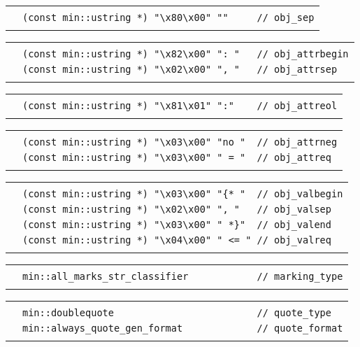 \documentclass[12pt]{article}
\newenvironment{indpar}[1][0.3in]%
	{\begin{list}{}%
		     {\setlength{\itemsep}{0in}%
		      \setlength{\topsep}{0in}%
		      \setlength{\parsep}{1ex}%
		      \setlength{\labelwidth}{#1}%
		      \setlength{\leftmargin}{#1}%
		      \addtolength{\leftmargin}{\labelsep}}%
	 \item}%
	{\end{list}}
\newlength{\ARGBREAKLENGTH}
\newcommand{\ARGBREAK}[1][\ARGBREAKLENGTH]{\\&\hspace*{#1}}
\begin{document}
\begin{indpar}[1em]
\vspace{-4ex}\begin{tabular}{r@{}l}\hspace*{0.1in}\ARGBREAK
\verb|(const min::ustring *) "\x80\x00" ""     // obj_sep|\ARGBREAK
\end{tabular}

\vspace{-4ex}\begin{tabular}{r@{}l}\hspace*{0.1in}\ARGBREAK
\verb|(const min::ustring *) "\x82\x00" ": "   // obj_attrbegin|\ARGBREAK
\verb|(const min::ustring *) "\x02\x00" ", "   // obj_attrsep|\ARGBREAK
\end{tabular}

\vspace{-4ex}\begin{tabular}{r@{}l}\hspace*{0.1in}\ARGBREAK
\verb|(const min::ustring *) "\x81\x01" ":"    // obj_attreol|\ARGBREAK
\end{tabular}

\vspace{-4ex}\begin{tabular}{r@{}l}\hspace*{0.1in}\ARGBREAK
\verb|(const min::ustring *) "\x03\x00" "no "  // obj_attrneg|\ARGBREAK
\verb|(const min::ustring *) "\x03\x00" " = "  // obj_attreq|\ARGBREAK
\end{tabular}

\vspace{-4ex}\begin{tabular}{r@{}l}\hspace*{0.1in}\ARGBREAK
\verb|(const min::ustring *) "\x03\x00" "{* "  // obj_valbegin|\ARGBREAK
\verb|(const min::ustring *) "\x02\x00" ", "   // obj_valsep|\ARGBREAK
\verb|(const min::ustring *) "\x03\x00" " *}"  // obj_valend|\ARGBREAK
\verb|(const min::ustring *) "\x04\x00" " <= " // obj_valreq|\ARGBREAK
\end{tabular}

\vspace{-4ex}\begin{tabular}{r@{}l}\hspace*{0.1in}\ARGBREAK
\verb|min::all_marks_str_classifier            // marking_type|\ARGBREAK
\end{tabular}

\vspace{-4ex}\begin{tabular}{r@{}l}\hspace*{0.1in}\ARGBREAK
\verb|min::doublequote                         // quote_type|\ARGBREAK
\verb|min::always_quote_gen_format             // quote_format|\ARGBREAK
\end{tabular}


\end{indpar}
\end{document}
